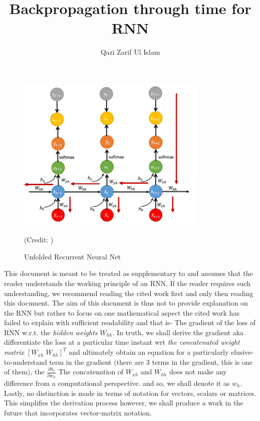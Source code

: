 \documentclass[12pt, letterpaper]{article}
\title{Backpropagation through time for RNN}
\author{Qazi Zarif Ul Islam}
\begin{document}
\maketitle

\begin{figure}[htpb]
    \centering
    \includegraphics[width=0.8\textwidth]{rnn.png}
    \caption*{Unfolded Recurrent Neural Net} (Credit: \cite{murat_bptt})
    \label{fig: rnn}
\end{figure}

This document is meant to be treated as supplementary to \cite{d2l_bptt} and assumes that the reader
understands the working principle of an RNN. If the reader requires such understanding, we recommend
reading the cited work first and only then reading this document. The aim of this document
is thus not to provide explanation on the RNN but rather to focus on one mathematical aspect
the cited work has failed to explain with sufficient readability and that is- The gradient of the loss of RNN
w.r.t. the \textit{hidden weights} $W_{hh}$. In truth, we shall
derive the gradient aka differentiate the loss at a particular
time instant wrt \textit{the concatenated weight matrix $[W_{xh}\;W_{hh}]^T$}
and ultimately obtain an equation for a particularly elusive-to-understand term in
the gradient (there are 3 terms in the gradient, this is one of them), the $\frac{\partial h_t}{\partial w_h}$
The concatenation of $W_{xh}$ and $W_{hh}$ does not make any difference from a computational
perspective. \cite{d2l_bptt, murat_bptt} and so, we shall denote it as $w_h$. Lastly, no distinction is 
made in terms of notation for vectors, scalars or matrices. This simplifies the derivation process however,
we shall produce a work in the future that incorporates vector-matrix notation.
\end{document}
